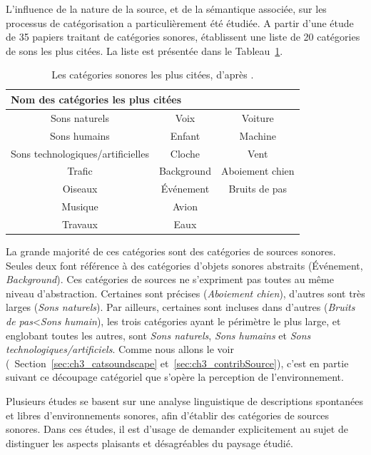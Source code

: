 L'influence de la nature de la source, et de la sémantique associée, sur les processus de catégorisation a particulièrement été étudiée. A partir d'une étude de 35 papiers traitant de catégories sonores, \citep{niessen2010categories} établissent une liste de 20 catégories de sons les plus citées. La liste est présentée dans le Tableau~\ref{tab:categoNiessen}.

\begin{table}[t]
\centering
\begin{tabular}{ccc}    
\multicolumn{3}{l}{Nom des catégories les plus citées} \\             
\hline
Sons naturels                    & Voix       & Voiture\\
Sons humains                     & Enfant     & Machine\\
Sons technologiques/artificielles & Cloche     & Vent \\
Trafic                           & Background & Aboiement chien\\
Oiseaux                          & Événement  & Bruits de pas\\
Musique                          & Avion      & \\
Travaux                          & Eaux       & \\
\hline
\end{tabular}
\vspace{0.5mm}
\caption[Les catégories sonores les plus citées.]{Les catégories sonores les plus citées, d'après \citep{niessen2010categories}.}
\label{tab:categoNiessen}
\end{table}

La grande majorité de ces catégories sont des catégories de sources sonores. Seules deux font référence à des catégories d'objets sonores abstraits (Événement, \emph{Background}). Ces catégories de sources ne s'expriment pas toutes au même niveau d'abstraction. Certaines sont précises (\emph{Aboiement chien}), d'autres sont très larges (\emph{Sons naturels}). Par ailleurs, certaines sont incluses dans d'autres (\emph{Bruits de pas}<\emph{Sons humain}), les trois catégories ayant le périmètre le plus large, et englobant toutes les autres, sont \emph{Sons naturels}, \emph{Sons humains} et \emph{Sons technologiques/artificiels}. Comme nous allons le voir (\cf~Section~\ref{sec:ch3_catsoundscape} et~\ref{sec:ch3_contribSource}), c'est en partie suivant ce découpage catégoriel que s'opère la perception de l'environnement.

Plusieurs études se basent sur une analyse linguistique de descriptions spontanées et libres d'environnements sonores, afin d'établir des catégories de sources sonores. Dans ces études, il est d'usage de demander explicitement au sujet de distinguer les aspects plaisants et désagréables du paysage étudié.

